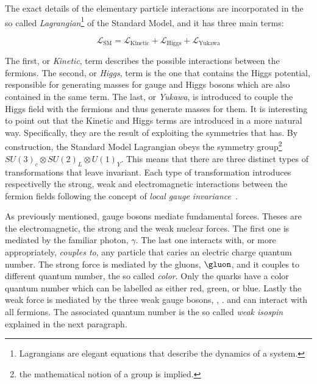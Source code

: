 The exact details of the elementary particle interactions are incorporated in the so called
{\it Lagrangian}\footnote{ Lagrangians are elegant equations that describe the dynamics of a system.} of the Standard Model,
and it has three main terms:

\begin{equation}
\mathscr{L}_{\text{SM}} =
\mathscr{L}_{\text{Kinetic}} + \mathscr{L}_{\text{Higgs}} + \mathscr{L}_{\text{Yukawa}}
\label{lagrangian}
\end{equation}

\noindent The first, or {\it Kinetic}, term describes the possible interactions between the fermions.
The second, or {\it Higgs}, term is the one that contains the Higgs potential, responsible for generating
masses for gauge and Higgs bosons which are also contained in the same term.
The last, or {\it Yukawa}, is introduced to couple the Higgs field with the fermions and thus generate masses for them.
It is interesting to point out that the Kinetic and Higgs terms are introduced in a more natural way.
Specifically, they are the result of exploiting the symmetries that  has.
By construction, the Standard Model Lagrangian obeys the symmetry group\footnote{the mathematical notion of a group is implied.}
$SU(3)_c\otimes SU(2)_L\otimes U(1)_Y$. This means that there are three distinct types of transformations
that leave  invariant. Each type of transformation introduces respectivelly the strong,
weak and electromagnetic interactions between the fermion fields following the concept of {\it local gauge invariance}~\cite{aitchison}.

As previously mentioned, gauge bosons mediate fundamental forces. Theses are the electromagnetic, the strong and the weak nuclear forces.
The first one is mediated by the familiar photon, $\gamma$. The last one interacts with, or more appropriately, {\it couples to}, any particle that
caries an electric charge quantum number. The strong force is mediated by the gluons, $\gluon$, and it couples to different quantum number,
the so called {\it color}. Only the quarks have a color quantum number which can be labelled as either red, green, or blue. Lastly the
weak force is mediated by the three weak gauge bosons, \Wpm, \Z. and can interact with all fermions. The associated quantum number is
the so called {\it weak isospin} explained in the next paragraph.

